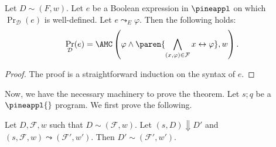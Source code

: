 \begin{lemma}\label{lemma:pineappl simulate expressions}
  Let $D \sim (F,w)$.
  Let $e$ be a Boolean expression in $\pineappl$ on which $\Pr_{\mathcal D} (e)$ is well-defined.
  Let $e \leadsto_E \varphi$. Then the following holds:
  \begin{equation}
    \Pr_{\mathcal D} (e) = \AMC\left(\varphi \land \paren{\bigwedge_{(x, \varphi) \in \mathcal F} x \leftrightarrow \varphi}, w\right).
  \end{equation}
\end{lemma}

\begin{proof}
  The proof is a straightforward induction on the syntax of $e$.
\end{proof}

Now, we have the necessary machinery to prove the theorem.
Let $s;q$ be a $\pineappl{}$ program. We first prove the following.

\begin{theorem}\label{thm:pineappl statements invariant}
  Let $D, \mathcal F, w$ such that $D \sim (\mathcal F, w)$.
  Let $(s, D) \Downarrow D'$ and $(s, \mathcal F, w) \leadsto (\mathcal F', w')$.
  Then $D' \sim (\mathcal F', w')$.
\end{theorem}

